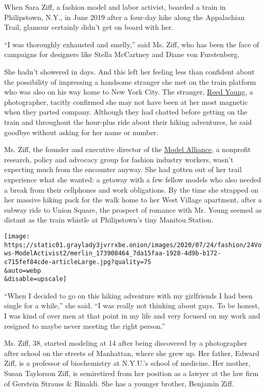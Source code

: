 When Sara Ziff, a fashion model and labor activist, boarded a train in
Philipstown, N.Y., in June 2019 after a four-day hike along the
Appalachian Trail, glamour certainly didn't get on board with her.

``I was thoroughly exhausted and smelly,'' said Ms. Ziff, who has been
the face of campaigns for designers like Stella McCartney and Diane von
Furstenberg.

She hadn't showered in days. And this left her feeling less than
confident about the possibility of impressing a handsome stranger she
met on the train platform who was also on his way home to New York City.
The stranger, \href{https://www.reedyoung.com/}{Reed Young}, a
photographer, tacitly confirmed she may not have been at her most
magnetic when they parted company. Although they had chatted before
getting on the train and throughout the hour-plus ride about their
hiking adventures, he said goodbye without asking for her name or
number.

Ms. Ziff, the founder and executive director of the
\href{https://modelalliance.org/}{Model Alliance}, a nonprofit research,
policy and advocacy group for fashion industry workers, wasn't expecting
much from the encounter anyway. She had gotten out of her trail
experience what she wanted: a getaway with a few fellow models who also
needed a break from their cellphones and work obligations. By the time
she strapped on her massive hiking pack for the walk home to her West
Village apartment, after a subway ride to Union Square, the prospect of
romance with Mr. Young seemed as distant as the train whistle at
Philipstown's tiny Manitou Station.

\texttt{[image: https://static01.graylady3jvrrxbe.onion/images/2020/07/24/fashion/24Vows-ModelActivist2/merlin\_173908464\_7da15faa-1928-4d9b-b172-c715fef84cde-articleLarge.jpg?quality=75\\\&auto=webp\\\&disable=upscale]}

``When I decided to go on this hiking adventure with my girlfriends I
had been single for a while,'' she said. ``I was really not thinking
about guys. To be honest, I was kind of over men at that point in my
life and very focused on my work and resigned to maybe never meeting the
right person.''

Ms. Ziff, 38, started modeling at 14 after being discovered by a
photographer after school on the streets of Manhattan, where she grew
up. Her father, Edward Ziff, is a professor of biochemistry at N.Y.U.'s
school of medicine. Her mother, Susan Taylorson Ziff, is semiretired
from her position as a lawyer at the law firm of Gerstein Strauss \&
Rinaldi. She has a younger brother, Benjamin Ziff.


